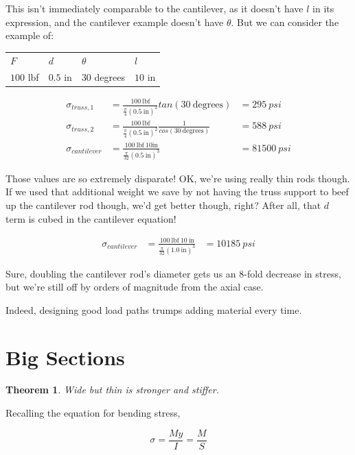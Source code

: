 \documentclass[10pt,letterpaper]{book}
\newtheorem{theorem}{Theorem}
\begin{document}
This isn't immediately comparable to the cantilever, as it doesn't have $l$ in its expression, and the cantilever example doesn't have $\theta$. But we can consider the example of:

\begin{table}[]
\begin{tabular}{llll}
$F$       & $d$      & $\theta$      & $l$     \\
$100$ lbf & $0.5$ in & $30$ degrees & $10$ in
\end{tabular}
\end{table}

\begin{align}
	\sigma_{truss, 1} &= \frac{100 \ \mbox{lbf}}{\frac{\pi}{4} (0.5 \ \mbox{in})^2 } tan(30 \ \mbox{degrees}) &= 295 \ psi\\
	\sigma_{truss, 2} &= \frac{100 \ \mbox{lbf}}{\frac{\pi}{4} (0.5 \ \mbox{in})^2 } \frac{1}{cos(30 \ \mbox{degrees})} &= 588 \ psi \\
	\sigma_{cantilever} &= \frac{100 \ \mbox{lbf} \ 10 \mbox{in}}{\frac{\pi}{32} (0.5 \ \mbox{in})^3} &= 81500 \ psi
\end{align}

Those values are so extremely disparate! OK, we're using really thin rods though. If we used that additional weight we save by not having the truss support to beef up the cantilever rod though, we'd get better though, right? After all, that $d$ term is cubed in the cantilever equation!

\begin{align}
	\sigma_{cantilever} &= \frac{100 \ \mbox{lbf} \ 10 \ \mbox{in}}{\frac{\pi}{32} (1.0 \ \mbox{in})^3} &= 10185 \ psi
\end{align}

Sure, doubling the cantilever rod's diameter gets us an 8-fold decrease in stress, but we're still off by orders of magnitude from the axial case.

Indeed, designing good load paths trumps adding material every time.

\section{Big Sections}
\begin{theorem} \label{theorem:big_sections}
Wide but thin is stronger and stiffer.
\end{theorem}

Recalling the equation for bending stress,

\begin{equation*}
	\sigma = \frac{M y}{I} = \frac{M}{S}
\end{equation*}
\end{document}
